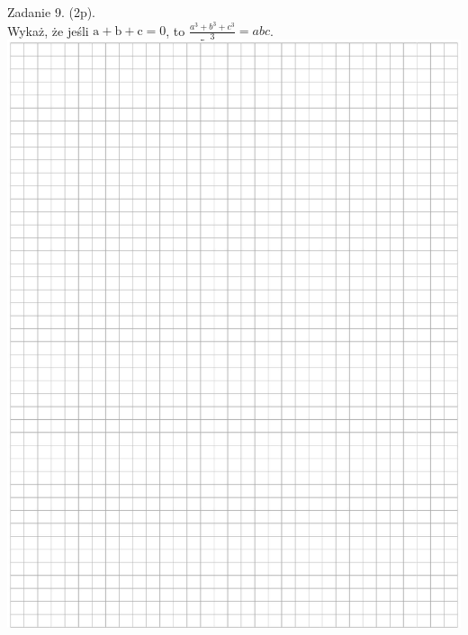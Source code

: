 \documentclass[10pt]{article}
\begin{document}
Zadanie 9. (2p).\\
Wykaż, że jeśli \(\mathrm{a}+\mathrm{b}+\mathrm{c}=0\), to \(\frac{a^{3}+b^{3}+c^{3}}{3}=a b c\).\\
\includegraphics[max width=\textwidth, center]{2024_11_21_498389c978c770348ebcg-07}
\end{document}
